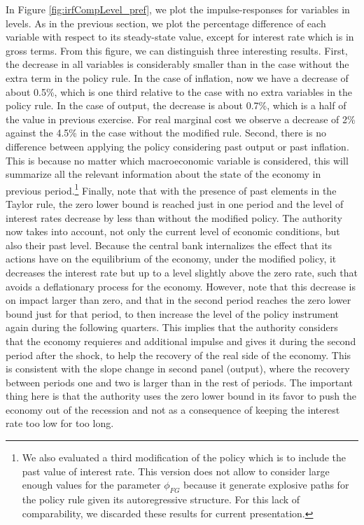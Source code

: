 \documentclass[11pt]{article}
\numberwithin{equation}{section}
\begin{document}
In Figure \ref{fig:irfCompLevel_pref}, we plot the impulse-responses for variables in levels. As in the previous section, we plot the percentage difference of each variable with respect to its steady-state value, except for interest rate which is in gross terms. From this figure, we can distinguish three interesting results. First, the decrease in all variables is considerably smaller than in the case without the extra term in the policy rule. In the case of inflation, now we have a decrease of about 0.5\%, which is one third relative to the case with no extra variables in the policy rule. In the case of output, the decrease is about 0.7\%, which is a half of the value in previous exercise. For real marginal cost we observe a decrease of 2\% against the 4.5\% in the case without the modified rule. Second, there is no difference between applying the policy considering past output or past inflation. This is because no matter which macroeconomic variable is considered, this will summarize all the relevant information about the state of the economy in previous period.\footnote{We also evaluated a third modification of the policy which is to include the past value of interest rate. This version does not allow to consider large enough values for the parameter $\phi_{FG}$ because it generate explosive paths for the policy rule given its autoregressive structure. For this lack of comparability, we discarded these results for current presentation.} Finally, note that with the presence of past elements in the Taylor rule, the zero lower bound is reached just in one period and the level of interest rates decrease by less than without the modified policy. The authority now takes into account, not only the current level of economic conditions, but also their past level. Because the central bank internalizes the effect that its actions have on the equilibrium of the economy, under the modified policy, it decreases the interest rate but up to a level slightly above the zero rate, such that avoids a deflationary process for the economy. However, note that this decrease is on impact larger than zero, and that in the second period reaches the zero lower bound just for that period, to then increase the level of the policy instrument again during the following quarters. This implies that the authority considers that the economy requieres and additional impulse and gives it during the second period after the shock, to help the recovery of the real side of the economy. This is consistent with the slope change in second panel (output), where the recovery between periods one and two is larger than in the rest of periods. The important thing here is that the authority uses the zero lower bound in its favor to push the economy out of the recession and not as a consequence of keeping the interest rate too low for too long.
\end{document}
